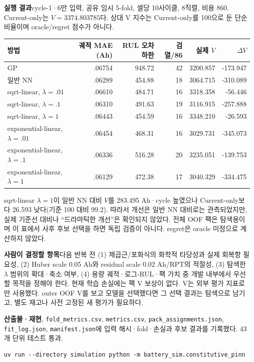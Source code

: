 \documentclass[11pt,a4paper]{article}
\newcommand{\file}[1]{{\small\nolinkurl{#1}}}
\begin{document}
\textbf{실행 결과}\quad cycle-1·6만 입력, 공유 임시 5-fold, 셀당 10사이클, 8직렬, 비용 860. Current-only는 $V=3374.803785$다. 상대 V 지수는 Current-only를 100으로 둔 단순 비율이며 oracle/regret 점수가 아니다.
\begin{center}
\begin{tabular}{lrrrrr}
\toprule
방법 & 궤적 MAE (Ah) & RUL 오차 하한 & 검열/86 & 실제 $V$ & $\Delta V$ \\
\midrule
GP & .06754 & 948.72 & 42 & 3200.857 & -173.947 \\
일반 NN & .06289 & 454.88 & 18 & 3064.715 & -310.089 \\
sqrt-linear, $\lambda=.01$ & .06610 & 484.71 & 16 & 3318.358 & -56.446 \\
sqrt-linear, $\lambda=.1$ & .06310 & 491.63 & 19 & 3116.915 & -257.888 \\
sqrt-linear, $\lambda=1$ & .06443 & 454.59 & 16 & 3348.210 & -26.593 \\
exponential-linear, $\lambda=.01$ & .06454 & 468.31 & 16 & 3029.731 & -345.073 \\
exponential-linear, $\lambda=.1$ & .06336 & 516.28 & 20 & 3235.051 & -139.753 \\
exponential-linear, $\lambda=1$ & .06129 & 472.38 & 17 & 3040.329 & -334.475 \\
\bottomrule
\end{tabular}
\end{center}
sqrt-linear $\lambda=1$이 일반 NN 대비 $V$를 283.495 Ah·cycle 높였으나 Current-only보다 26.593 낮다(기준 100 대비 99.2). 따라서 개선은 일반 NN 대비로는 관측되었지만, 실제 기준선 대비나 “드라마틱한 개선”은 확인되지 않았다. 전체 OOF 팩은 탐색용이며 이 표에서 사후 후보 선택을 하면 독립 검증이 아니다. regret은 oracle 미정으로 계산하지 않았다.

\textbf{사람이 결정할 항목}\quad 다음 반복 전 (1) 제곱근/포화식의 화학적 타당성과 실제 회복항 필요성, (2) Huber scale 0.05 Ah와 residual scale 0.02 Ah/RPT의 적절성, (3) 탐색한 $\lambda$ 범위의 확대·축소 여부, (4) 용량 궤적·로그-RUL·팩 가치 중 개발 내부에서 우선할 목적을 정해야 한다. 현재 학습 손실에는 팩 V 보상이 없다. V는 외부 평가 지표로만 사용했다. outer OOF V를 보고 모델을 선택했다면 그 선택 결과는 탐색으로 남기고, 별도 재고나 사전 고정된 새 평가가 필요하다.

\textbf{산출물·재현}\quad \file{oof_predictions.csv}, \file{fold_metrics.csv}, \file{metrics.csv}, \file{pack_assignments.json}, \file{fit_log.json}, \file{manifest.json}에 입력 해시·fold·손실과 후보 결과를 기록했다. 43개 단위 테스트 통과.
\begin{Verbatim}[fontsize=\small]
uv run --directory simulation python -m battery_sim.constitutive_pinn
\end{Verbatim}
\end{document}
